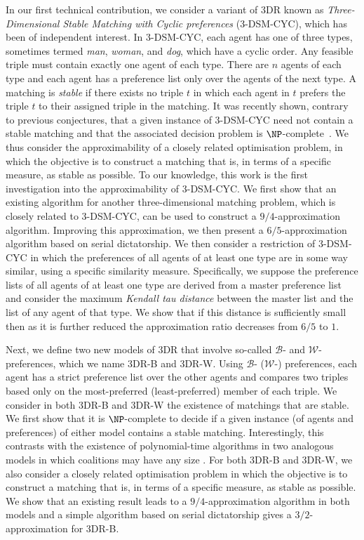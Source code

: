 In our first technical contribution, we consider a variant of 3DR known as \emph{Three-Dimensional Stable Matching with Cyclic preferences} (3-DSM-CYC), which has been of independent interest. In 3-DSM-CYC, each agent has one of three types, sometimes termed \emph{man}, \emph{woman}, and \emph{dog}, which have a cyclic order. Any feasible triple must contain exactly one agent of each type. There are $n$ agents of each type and each agent has a preference list only over the agents of the next type. A matching is \emph{stable} if there exists no triple $t$ in which each agent in $t$ prefers the triple $t$ to their assigned triple in the matching. It was recently shown, contrary to previous conjectures, that a given instance of 3-DSM-CYC need not contain a stable matching and that the associated decision problem is $\NP$-complete~\cite{Plaxton3DSMCYCJournal}. We thus consider the approximability of a closely related optimisation problem, in which the objective is to construct a matching that is, in terms of a specific measure, as stable as possible. To our knowledge, this work is the first investigation into the approximability of 3-DSM-CYC. We first show that an existing algorithm for another three-dimensional matching problem, which is closely related to 3-DSM-CYC, can be used to construct a $9/4$-approximation algorithm. Improving this approximation, we then present a $6/5$-approximation algorithm based on serial dictatorship. We then consider a restriction of 3-DSM-CYC in which the preferences of all agents of at least one type are in some way similar, using a specific similarity measure. Specifically, we suppose the preference lists of all agents of at least one type are derived from a master preference list and consider the maximum \emph{Kendall tau distance} \cite{KendallTauCitation} between the master list and the list of any agent of that type. We show that if this distance is sufficiently small then as it is further reduced the approximation ratio decreases from $6/5$ to $1$.

Next, we define two new models of 3DR that involve so-called $\mathscr{B}$- and $\mathscr{W}$-preferences, which we name 3DR-B and 3DR-W. Using $\mathscr{B}$- ($\mathscr{W}$-) preferences, each agent has a strict preference list over the other agents and compares two triples based only on the most-preferred (least-preferred) member of each triple. We consider in both 3DR-B and 3DR-W the existence of matchings that are stable. We first show that it is $\NP$-complete to decide if a given instance (of agents and preferences) of either model contains a stable matching. Interestingly, this contrasts with the existence of polynomial-time algorithms in two analogous models in which coalitions may have any size \cite{CR01, CH04}. For both 3DR-B and 3DR-W, we also consider a closely related optimisation problem in which the objective is to construct a matching that is, in terms of a specific measure, as stable as possible. We show that an existing result leads to a $9/4$-approximation algorithm in both models and a simple algorithm based on serial dictatorship gives a $3/2$-approximation for 3DR-B.

